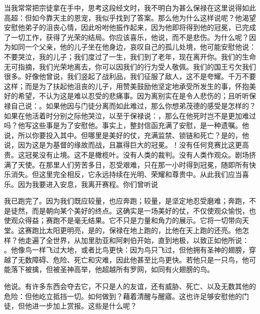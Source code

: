 当我常常把宗徒拿在手中，思考这段经文时，我不明白为甚么保禄在这里说得如此高超：但如今靠天主的恩宠，我似乎找到了答案。那么他为什么这样说呢？他渴望安慰他弟子的沮丧心情，因此吩咐他振作起来，因为他即将得到他的冠冕，已完成了一切工作，获得了光荣的结局。你应该喜乐，他说，而不是悲伤。为什么呢？因为如同一个父亲，他的儿子坐在他身边，哀叹自己的孤儿处境，他可能安慰他说：不要哭泣，我的儿子；我们度过了一生，我们到了老年，现在离开你。我们的生命无可指摘，我们光荣地离去，你可以因我们的行为受人敬佩。我们的国王亏欠我们很多。好像他曾说，我们竖起了战利品，我们征服了敌人，这不是夸耀。千万不要这样；而是为了扶起他沮丧的儿子，用赞美鼓励他坚定地承受所发生的事，怀抱美好的希望，不认为这是难以忍受的悲痛事。因为离别实在是令人悲伤的；且听听保禄自己说：。如果他因与门徒分离而如此难过，那么你想弟茂德的感受是怎样的？如果在他活着时分别之际他哭泣，以至于保禄说：，那么在他死时岂不是更加难过吗？他写这些事是为了安慰他。事实上，整封信函充满了安慰，是一种遗嘱。他说，所以你要投入其中。但哪里是美好的仗，充满监禁、锁链和死亡？是的，他说，因为这是为基督的缘故而战，且赢得巨大的冠冕。！没有任何竞赛比这更高贵。这冠冕没有止境。这不是橄榄叶。没有人类的裁判。没有人类作观众。剧场挤满了天使。在那里人们劳苦多日，忍受艰难，只在那一小时得到冠冕，随即所有快乐消失。但这里完全相反，它永远持续在光明、荣耀和尊贵中。从此我们应当喜乐。因为我要进入安息，我离开赛程。你们曾听说\par

我已跑完了。因为我们既应较量，也应奔跑；较量，是坚定地忍受磨难；奔跑，不是徒然，而是朝向某个美好的终点。这确实是一场美好的仗，不仅使观众愉悦，也使观众得益；赛跑不是毫无结果。它不只是力量和角力的展示。它将一切带向天堂。这赛跑比太阳更明亮，是的，保禄在地上跑的，比他在天上跑的还亮。他怎样？他走遍了全世界，从加里肋亚和阿剌伯开始，直到地极，以致正如他所说： 。他像鸟一样飞过大地，或者比鸟更快：因为鸟只飞过，但他拥有圣神的翅膀，穿越了无数障碍、危险、死亡和灾难，因此他甚至比鸟更快。若他只是一只鸟，他可能落下被擒，但被圣神高举，他超越所有罗网，如同有火翅膀的鸟。\par

他说。有许多东西会夺去它，不只是人的友谊，还有威胁、死亡、以及无数其他的危险：但他屹立抵挡一切。如何做到？藉着清醒与醒寤。这也许足够安慰他的门徒，但他进一步加上赏报。这些是什么呢？\par

